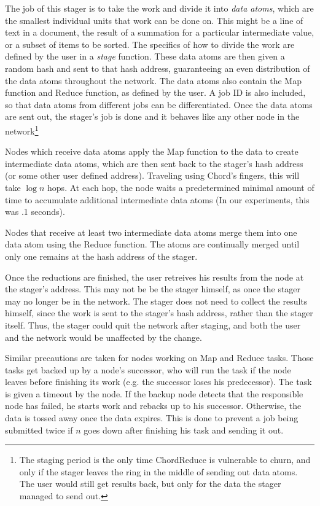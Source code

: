 \documentclass[10pt, conference, compsocconf]{IEEEtran}
\begin{document}
The job of this stager is to take the work and divide it into \emph{data atoms}, which are the smallest individual units that work can be done on.  This might be a line of text in a document, the result of a summation for a particular intermediate value, or a subset of items to be sorted.  The specifics of how to divide the work are defined by the user in a \emph{stage} function.  These data atoms are then given a random hash and sent to that hash address, guaranteeing an even distribution of the data atoms throughout the network.  The data atoms also contain the Map function and Reduce function, as defined by the user.  A job ID is also included, so that data atoms from different jobs can be differentiated.  Once the data atoms are sent out, the stager's job is done and it behaves like any other node in the network\footnote{The staging period is the only time ChordReduce is vulnerable to churn, and only if the stager leaves the ring in the middle of sending out data atoms.  The user would still get results back, but only for the data the stager managed to send out.}

Nodes which receive data atoms apply the Map function to the data to create intermediate data atoms, which are then sent back to the stager's hash address (or some other user defined address).  Traveling using Chord's fingers, this will take $\log n$ hops.  At each hop, the node waits a predetermined minimal amount of time to accumulate additional intermediate data atoms (In our experiments, this was .1 seconds).

Nodes that receive at least two intermediate data atoms merge them into one data atom using the Reduce function.  The atoms are continually merged until only one remains at the hash address of the stager. 

Once the reductions are finished, the user retreives his results from the node at the stager's address.  This may not be be the stager himself, as once the stager may no longer be in the network.  The stager does not need to collect the results himself, since the work is sent to the stager's hash address, rather than the stager itself.  Thus, the stager could quit the network after staging, and both the user and the network would be unaffected by the change. %

Similar precautions are taken for nodes working on Map and Reduce tasks.  Those tasks get backed up by a node's successor, who will run the task if the node leaves before finishing its work (e.g. the successor loses his predecessor).   The task is given a timeout by the node.  If the backup node detects that the responsible node has failed, he starts work and rebacks up to his successor.  Otherwise, the data is tossed away once the data expires. This is done to prevent a job being submitted twice if $n$ goes down after finishing his task and sending it out.
\end{document}
